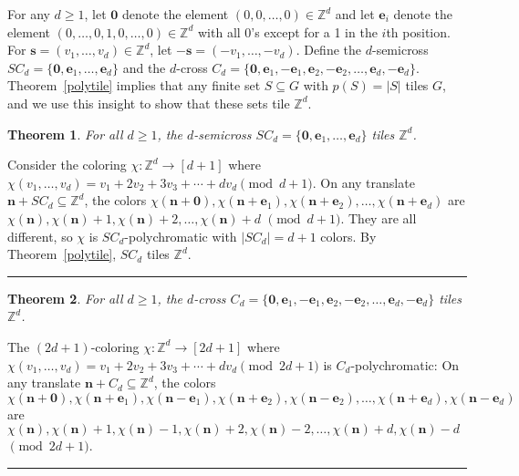 \documentclass[12pt]{article}
\newenvironment{proof}{{\bf Proof:  }}{\hfill\rule{2mm}{2mm}}
\newtheorem{theorem}{Theorem}
\newcommand{\Z}{\ensuremath{\mathbb Z}}
\newcommand{\vect}[1]{\bm{#1}}
\begin{document}
For any $d\ge 1$, let $\vect{0}$ denote the element $(0,0,\ldots, 0)\in \Z^d$ and
 let $\vect{e}_i$ denote the element $(0,\ldots, 0,1,0, \ldots,0) \in \Z^d$ with all 0's except for a 1 in the $i$th position. For $\vect{s} = (v_1, \ldots, v_d) \in \Z^d$, let $-\vect{s}=(-v_1, \ldots, -v_d)$.  Define the $d$-semicross $SC_d = \{\vect{0},\vect{e}_1, \ldots, \vect{e}_d\}$ and the $d$-cross $C_d=\{\vect{0},\vect{e}_1,-\vect{e}_1, \vect{e}_2, -\vect{e}_2, \ldots, \vect{e}_d, -\vect{e}_d\}$.  Theorem~\ref{polytile} implies that any finite set $S \subseteq G$ with $p(S)=|S|$ tiles $G$, and we use this insight to show that these sets tile $\Z^d$.

\begin{theorem}\label{startile}
For all $d \ge 1$, the $d$-semicross $SC_d=\{\vect{0},\vect{e}_1, \ldots, \vect{e}_d\}$ tiles $\Z^d$. 
\end{theorem}

\begin{proof}
Consider the coloring $\chi:\Z^d \to [d+1]$ where $\chi(v_1, \ldots, v_d) = v_1 + 2v_2 + 3v_3 + \cdots +dv_d \pmod{d+1}$.  On any translate $\vect{n} + SC_d \subseteq \Z^d$, the colors $\chi(\vect{n}+\vect{0}), \chi(\vect{n}+\vect{e}_1), \chi(\vect{n}+\vect{e}_2), \ldots, \chi(\vect{n}+\vect{e}_d)$ are $\chi(\vect{n}), \chi(\vect{n})+1, \chi(\vect{n})+2, \ldots, \chi(\vect{n})+d$ $\pmod{d+1}$.  They are all different, so $\chi$ is $SC_d$-polychromatic with $|SC_d|=d+1$ colors.  By Theorem~\ref{polytile}, $SC_d$ tiles $\Z^d$.
\end{proof}



\begin{theorem}\label{dcro}
For all $d \ge 1$, the $d$-cross $C_d=\{\vect{0},\vect{e}_1,-\vect{e}_1, \vect{e}_2, -\vect{e}_2, \ldots, \vect{e}_d, -\vect{e}_d\}$ tiles $\Z^d$.
\end{theorem}

\begin{proof}
The $(2d+1)$-coloring $\chi:\Z^d \to [2d+1]$ where $\chi(v_1, \ldots, v_d) = v_1 + 2v_2 + 3v_3 + \cdots +dv_d \pmod{2d+1}$ is $C_d$-polychromatic:  On any translate $\vect{n} + C_d \subseteq \Z^d$, the colors $\chi(\vect{n}+\vect{0}), \chi(\vect{n}+\vect{e}_1), \chi(\vect{n}-\vect{e}_1), \chi(\vect{n}+\vect{e}_2), \chi(\vect{n}-\vect{e}_2),\ldots, \chi(\vect{n}+\vect{e}_d), \chi(\vect{n}-\vect{e}_d)$ are $\chi(\vect{n}), \chi(\vect{n})+1, \chi(\vect{n})-1, \chi(\vect{n})+2, \chi(\vect{n})-2, \ldots, \chi(\vect{n})+d, \chi(\vect{n})-d$ $\pmod{2d+1}$. 
\end{proof}
\end{document}
